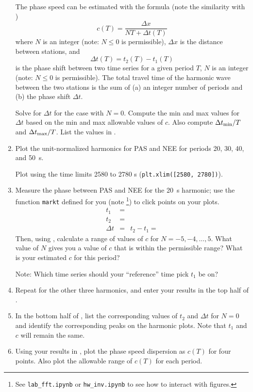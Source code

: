 \documentclass[11pt,titlepage,fleqn]{article}
\begin{document}
\begin{enumerate}
The phase speed can be estimated with the formula (note the similarity with )
%
\begin{equation}
c(T) = \frac{\Delta x}{N T + \Delta t(T)}
\label{phase}
\end{equation}
%
where $N$ is an integer (note: $N \le 0$ is permissible), $\Delta x$ is the distance between stations, and
%
\begin{equation*}
\Delta t(T) = t_2(T) - t_1(T)
\end{equation*}
%
is the phase shift between two time series for a given period $T$, $N$ is an integer (note: $N \le 0$ is permissible). The total travel time of the harmonic wave between the two stations is the sum of (a) an integer number of periods and (b) the phase shift $\Delta t$.

Solve for $\Delta t$ for the case with $N = 0$. Compute the min and max values for $\Delta t$ based on the min and max allowable values of $c$. Also compute $\Delta t_{\rm min}/T$ and $\Delta t_{\rm max}/T$. List the values in .


\item Plot the unit-normalized harmonics for PAS and NEE for periods 20, 30, 40, and 50~s.

Plot using the time limits 2580 to 2780 s (\verb+plt.xlim([2580, 2780])+).

\item Measure the phase between PAS and NEE for the 20~s harmonic; use the function \verb+markt+ defined for you (note \footnote{See {\tt lab\_fft.ipynb} or {\tt hw\_inv.ipynb} to see how to interact with figures.}) to click points on your plots. 
%
\begin{eqnarray*}
t_1 &=& 
\\
t_2 &=& 
\\
\Delta t &=& t_2 - t_1 =
\end{eqnarray*}
%
Then, using , calculate a range of values of $c$ for $N = -5, -4, \ldots, 5$. What value of $N$ gives you a value of $c$ that is within the permissible range? What is your estimated $c$ for this period?

Note: Which time series should your ``reference'' time pick $t_1$ be on?


\item Repeat for the other three harmonics, and enter your results in the top half of .


\item In the bottom half of , list the corresponding values of $t_2$ and $\Delta t$  for $N = 0$ and identify the corresponding peaks on the harmonic plots. Note that $t_1$ and $c$ will remain the same.

\item Using your results in , plot the phase speed dispersion as $c(T)$ for four points. Also plot the allowable range of $c(T)$ for each period.

\end{enumerate}
\end{document}
